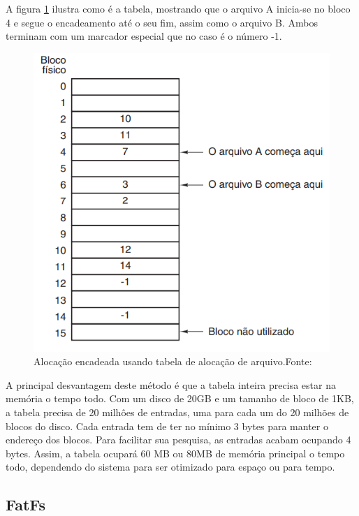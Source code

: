 A figura \ref{FAT} ilustra como é a tabela, mostrando que o arquivo A inicia-se no bloco 4 e segue o encadeamento até o seu fim, assim como o arquivo B. Ambos terminam com um marcador especial que no caso é o número -1.

\begin{figure}[H]
    \scriptsize
     \centering
     \includegraphics[scale=0.7]{dados/figuras/FAT.png}
     \caption{Alocação encadeada usando tabela de alocação de arquivo.\newline  Fonte:\cite{tanenbaumSO}}
     \label{FAT}
\end{figure}

A principal desvantagem deste método é que a tabela inteira precisa estar na memória o tempo todo. Com um disco de 20GB e um tamanho de bloco de 1KB, a tabela precisa de 20 milhôes de entradas, uma para cada um do 20 milhões de blocos do disco. Cada entrada tem de ter no mínimo 3 bytes para manter o endereço dos blocos. Para facilitar sua pesquisa, as entradas acabam ocupando 4 bytes. Assim, a tabela ocupará 60 MB ou 80MB de memória principal o tempo todo, dependendo do sistema para ser otimizado para espaço ou para tempo.

\subsection{FatFs}


